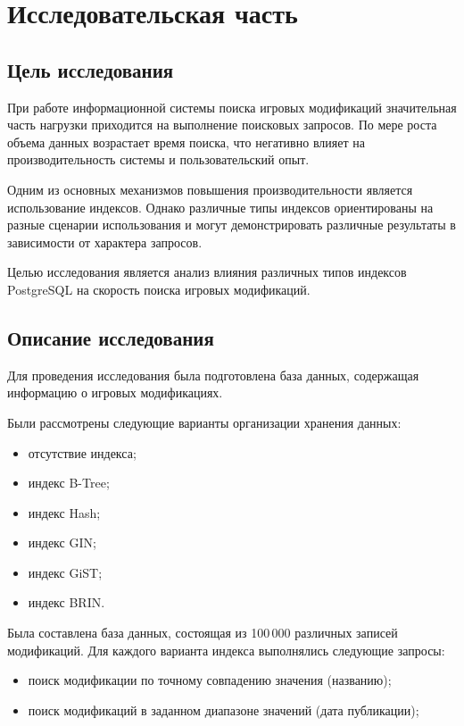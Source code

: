 \chapter{Исследовательская часть}

\section{Цель исследования}

При работе информационной системы поиска игровых модификаций значительная часть нагрузки приходится на выполнение поисковых запросов. По мере роста объема данных возрастает время поиска, что негативно влияет на производительность системы и пользовательский опыт.

Одним из основных механизмов повышения производительности является использование индексов. Однако различные типы индексов ориентированы на разные сценарии использования и могут демонстрировать различные результаты в зависимости от характера запросов.

Целью исследования является анализ влияния различных типов индексов PostgreSQL на скорость поиска игровых модификаций.

\section{Описание исследования}

Для проведения исследования была подготовлена база данных, содержащая информацию о игровых модификациях.

Были рассмотрены следующие варианты организации хранения данных:

\begin{itemize}
	\item отсутствие индекса;
	\item индекс B-Tree;
	\item индекс Hash;
	\item индекс GIN;
	\item индекс GiST;
	\item индекс BRIN.
\end{itemize}

Была составлена база данных, состоящая из 100\,000 различных записей модификаций.
Для каждого варианта индекса выполнялись следующие запросы:

\begin{itemize}
	\item поиск модификации по точному совпадению значения (названию);
	\item поиск модификаций в заданном диапазоне значений (дата публикации);
\end{itemize}

